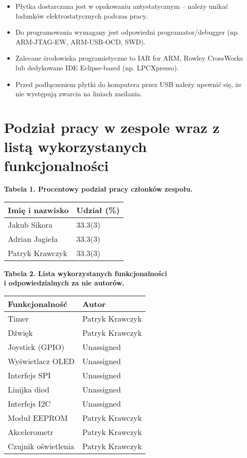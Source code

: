 \documentclass[a4paper,12pt]{report}
\begin{document}
\begin{itemize}
    \item Płytka dostarczana jest w opakowaniu antystatycznym -- należy unikać ładunków elektrostatycznych podczas pracy.
    \item Do programowania wymagany jest odpowiedni programator/debugger (np. ARM-JTAG-EW, ARM-USB-OCD, SWD).
    \item Zalecane środowiska programistyczne to IAR for ARM, Rowley CrossWorks lub dedykowane IDE Eclipse-based (np. LPCXpresso).
    \item Przed podłączeniem płytki do komputera przez USB należy upewnić się, że nie występują zwarcia na liniach zasilania.
\end{itemize}
\clearpage

\chapter{Podział pracy w zespole wraz z listą wykorzystanych funkcjonalności}
\begin{table}[h]
    \centering
    \textbf{Tabela 1. Procentowy podział pracy członków zespołu.\\}
    \vspace{1em}
    \begin{tabular}{|l|l|}
        \hline
        Imię i nazwisko     & Udział (\%) \\
        \hline
        Jakub Sikora        & 33.3(3)      \\
        Adrian Jagieła      & 33.3(3)      \\
        Patryk Krawczyk     & 33.3(3)      \\
        \hline
    \end{tabular}

    \vspace{2em}
    \textbf{Tabela 2. Lista wykorzystanych funkcjonalności \\ i odpowiedzialnych za nie autorów. \\}
    \vspace{1em}
    \begin{tabular}{|l|l|}
        \hline
        Funkcjonalność      & Autor        \\
        \hline
        Timer               & Patryk Krawczyk \\
        Dźwięk              & Patryk Krawczyk \\
        Joystick (GPIO)     & Unassigned \\
        Wyświetlacz OLED    & Unassigned \\
        Interfejs SPI       & Unassigned \\
        Linijka diod        & Unassigned \\
        Interfejs I2C       & Unassigned \\
        Moduł EEPROM        & Patryk Krawczyk \\
        Akcelerometr        & Patryk Krawczyk \\
        Czujnik oświetlenia & Patryk Krawczyk \\
        \hline
    \end{tabular}
\end{table}
\end{document}

